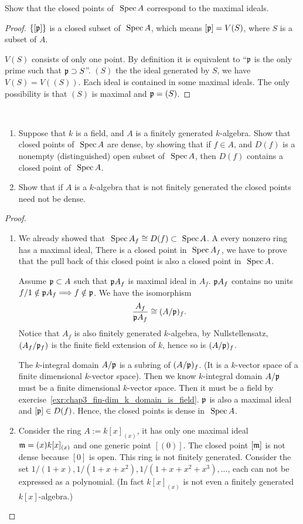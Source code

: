 \begin{exr}
Show that the closed points of $\text{ Spec\,} A$ correspond to the maximal ideals.
\end{exr}
\begin{proof}
$\{[{\mathfrak p}]\}$ is a closed subset of $\text{ Spec\,} A$, which means $[{\mathfrak p}]=V(S)$, where $S$ is a subset of $A$.

$V(S)$ consists of only one point. By definition it is equivalent to ``${\mathfrak p}$ is the only prime such that ${\mathfrak p}\supset S$''. $(S)$ the the ideal generated by $S$, we have $V(S)=V((S))$. Each ideal is contained in some maximal ideals. The only possibility is that $(S)$ is maximal and ${\mathfrak p}=(S)$.
\end{proof}

\begin{exr}\label{chap3exr:closed_point_dense}\ 
\begin{enumerate}[label=(\alph*)]
\item 
Suppose that $k$ is a field, and $A$ is a finitely generated $k$-algebra. Show that closed points of $\text{ Spec\,} A $ are dense, by showing that if $f \in A$, and $D(f)$ is a nonempty (distinguished) open subset of $\text{ Spec\,} A$, then $D(f)$ contains a closed point of $\text{ Spec\,} A$. 
\item Show that if $A$ is a $k$-algebra that is not finitely generated the closed points need not be dense. 
\end{enumerate}
\end{exr}
\begin{proof}
\begin{enumerate}[label=(\alph*)]
\item 
We already showed that $\text{ Spec\,} A_f\cong D(f)\subset \text{ Spec\,} A$. A every nonzero ring has a maximal ideal, There is a closed point in $\text{ Spec\,} A_f$, we have to prove that the pull back of this closed point is also a closed point in $\text{ Spec\,} A$.

Assume ${\mathfrak p}\subset A$ such that ${\mathfrak p} A_f$ is  maximal ideal in $A_f$. ${\mathfrak p} A_f$ contains no units $f/1\notin{\mathfrak p} A_f\Longrightarrow f\notin{\mathfrak p}$. We have the isomorphism 
$$
\frac{A_f}{{\mathfrak p} A_f}\cong (A/{\mathfrak p})_{f}.
$$
Notice that $A_f$ is also finitely generated $k$-algebra, by Nullstellensatz, $(A_f/{\mathfrak p}_f)$ is the finite field extension of $k$, hence so is $(A/{\mathfrak p})_f$.

The $k$-integral domain $A/{\mathfrak p}$ is a subring of $(A/{\mathfrak p})_f$. (It is a $k$-vector space of a finite dimensional $k$-vector space). Then we know $k$-integral domain $A/{\mathfrak p}$ must be a finite dimensional $k$-vector space. Then it must be a field by exercise~\ref{exr:chap3_fin-dim_k_domain_is_field}.
${\mathfrak p}$ is also a maximal ideal and $[{\mathfrak p}]\in D(f)$. Hence, the closed points is dense in $\text{ Spec\,} A$.
\item Consider the ring $A:=k[x]_{(x)}$, it has only one maximal ideal ${\mathfrak m}=(x)k[x]_{(x)}$ and one generic point $[(0)]$. The closed point $[{\mathfrak m}]$ is not dense because ${[0]}$ is open. This ring is not finitely generated. Consider the set $1/(1+x), 1/(1+x+x^2),1/(1+x+x^2+x^3),...$, each can not be expressed as a polynomial. (In fact $k[x]_{(x)}$ is not even a finitely generated $k[x]$-algebra.)
\end{enumerate}
\end{proof}

